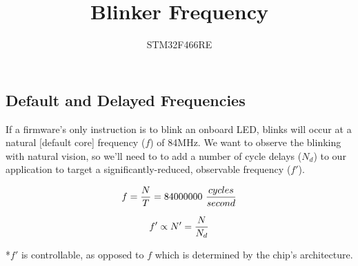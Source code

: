 \documentclass[a4paper,12pt]{article}   	%
\title{Blinker Frequency}
\author{STM32F466RE}
\begin{document}
\maketitle

\subsection*{Default and Delayed Frequencies}
\large
If a firmware's only instruction is to blink an onboard LED,
blinks will occur at a natural [default core]
frequency ($f$) of 84MHz. We want to observe the blinking 
with natural vision, so we'll need to to add a number of cycle delays 
($N_d$) to our application to target a 
significantly-reduced, observable frequency ($f'$).

$$f = \frac{N}{T} = 84000000\ \frac{cycles}{second}\\[1 ex]$$

$$f' \propto N' = \frac{N}{N_{d}}\\[1 ex]$$
\large

\normalsize
*$f'$ is controllable, as opposed to $f$ which is determined by the chip's architecture.
\end{document}
